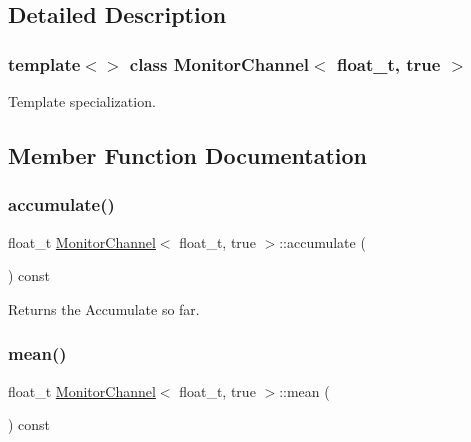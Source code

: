 \subsection{Detailed Description}
\subsubsection*{template$<$$>$\newline
class Monitor\+Channel$<$ float\+\_\+t, true $>$}

Template specialization. 

\subsection{Member Function Documentation}
\mbox{\label{classMonitorChannel_3_01float__t_00_01true_01_4_a980a02eba695a4fa8058115c61b08d78}} 
\subsubsection{\texorpdfstring{accumulate()}{accumulate()}}
{\footnotesize\ttfamily float\+\_\+t \hyperlink{classMonitorChannel}{Monitor\+Channel}$<$ float\+\_\+t, true $>$\+::accumulate (\begin{DoxyParamCaption}{ }\end{DoxyParamCaption}) const\hspace{0.3cm}{\ttfamily [inline]}}



Returns the {\ttfamily Accumulate} so far. 

\mbox{\label{classMonitorChannel_3_01float__t_00_01true_01_4_adcd78d97979f01547d020df57de1228c}} 
\subsubsection{\texorpdfstring{mean()}{mean()}}
{\footnotesize\ttfamily float\+\_\+t \hyperlink{classMonitorChannel}{Monitor\+Channel}$<$ float\+\_\+t, true $>$\+::mean (\begin{DoxyParamCaption}{ }\end{DoxyParamCaption}) const\hspace{0.3cm}{\ttfamily [inline]}}



